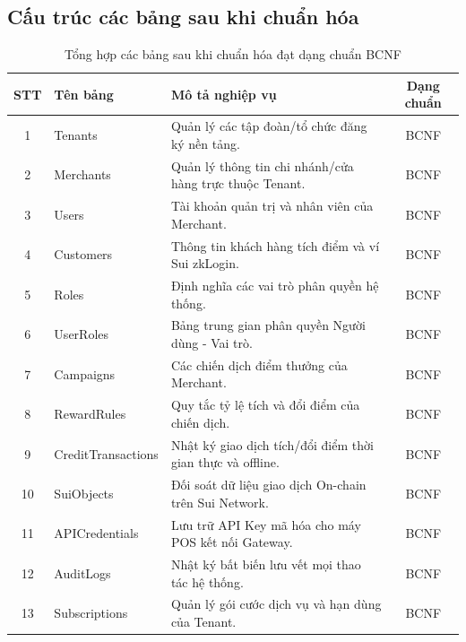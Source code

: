 \subsection{Cấu trúc các bảng sau khi chuẩn hóa}
\begin{table}[H]
\centering
\caption{Tổng hợp các bảng sau khi chuẩn hóa đạt dạng chuẩn BCNF}
\begin{tabular}{|c|l|p{7.5cm}|c|}
\hline
\textbf{STT} & \textbf{Tên bảng} & \textbf{Mô tả nghiệp vụ} & \textbf{Dạng chuẩn} \\ \hline
1 & Tenants & Quản lý các tập đoàn/tổ chức đăng ký nền tảng. & BCNF \\ \hline
2 & Merchants & Quản lý thông tin chi nhánh/cửa hàng trực thuộc Tenant. & BCNF \\ \hline
3 & Users & Tài khoản quản trị và nhân viên của Merchant. & BCNF \\ \hline
4 & Customers & Thông tin khách hàng tích điểm và ví Sui zkLogin. & BCNF \\ \hline
5 & Roles & Định nghĩa các vai trò phân quyền hệ thống. & BCNF \\ \hline
6 & UserRoles & Bảng trung gian phân quyền Người dùng - Vai trò. & BCNF \\ \hline
7 & Campaigns & Các chiến dịch điểm thưởng của Merchant. & BCNF \\ \hline
8 & RewardRules & Quy tắc tỷ lệ tích và đổi điểm của chiến dịch. & BCNF \\ \hline
9 & CreditTransactions & Nhật ký giao dịch tích/đổi điểm thời gian thực và offline. & BCNF \\ \hline
10 & SuiObjects & Đối soát dữ liệu giao dịch On-chain trên Sui Network. & BCNF \\ \hline
11 & APICredentials & Lưu trữ API Key mã hóa cho máy POS kết nối Gateway. & BCNF \\ \hline
12 & AuditLogs & Nhật ký bất biến lưu vết mọi thao tác hệ thống. & BCNF \\ \hline
13 & Subscriptions & Quản lý gói cước dịch vụ và hạn dùng của Tenant. & BCNF \\ \hline
\end{tabular}
\end{table}